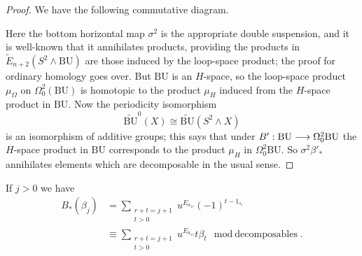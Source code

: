 \documentclass[../main]{subfiles}
\begin{document}
\begin{proof}
We have the following commutative diagram.
\begin{center}
\end{center}
Here the bottom horizontal map $\sigma^2$ is the appropriate double suspension, and it is well-known that it annihilates products, providing the products in $\widetilde{E}_{n+2}(S^2\wedge\mathrm{BU})$ are those induced by the loop-space product; the proof for ordinary homology goes over. But $\mathrm{BU}$ is an $H$-space, so the loop-space product $\mu_\Omega$ on $\Omega_0^2(\mathrm{BU})$ is homotopic to the product $\mu_H$ induced from the $H$-space product in $\mathrm{BU}$. Now the periodicity isomorphism \[\widetilde{\mathrm{BU}}^0(X)\cong \widetilde{\mathrm{BU}}(S^2\wedge X)\] is an isomorphism of additive groups; this says that under $B':\mathrm{BU}\longrightarrow\Omega^2_0\mathrm{BU}$ the $H$-space product in $\mathrm{BU}$ corresponds to the product $\mu_H$ in $\Omega_0^2\mathrm{BU}$. So $\sigma^2\beta'_\ast$ annihilates elements which are decomposable in the usual sense.
\end{proof}
\begin{customprop}{12.6}
\label{prop:p2c12.6}
If $j>0$ we have
\begin{align*}
B_\ast(\beta_j) &= \sum_{\substack{r+t=j+1\\t>0}} u^{E_{a_{1r}}} (-1)^{t-1_{s_t}}\\
&\equiv \sum_{\substack{r+t=j+1\\t>0}} u^{E_{a_{1r}}} t\beta_t \mod{\text{decomposables}}.
\end{align*}
\end{customprop}
\end{document}
